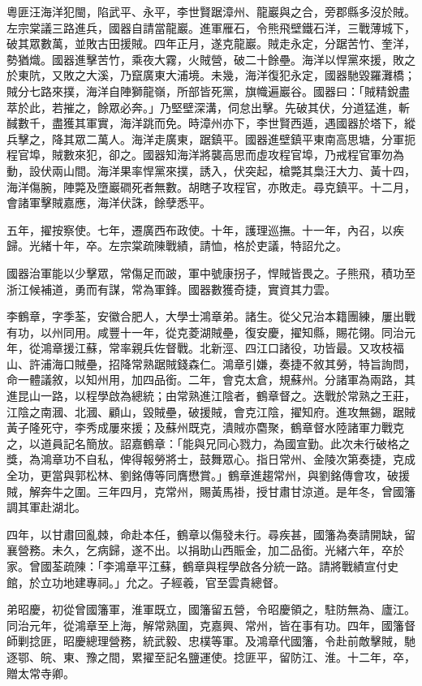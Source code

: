 \begin{pinyinscope}
粵匪汪海洋犯閩，陷武平、永平，李世賢踞漳州、龍巖與之合，旁郡縣多沒於賊。左宗棠議三路進兵，國器自請當龍巖。進軍雁石，令熊飛壁鐵石洋，三戰薄城下，破其眾數萬，並敗古田援賊。四年正月，遂克龍巖。賊走永定，分踞苦竹、奎洋，勢猶熾。國器進擊苦竹，乘夜大霧，火賊營，破二十餘壘。海洋以悍黨來援，敗之於東阬，又敗之大溪，乃竄廣東大浦境。未幾，海洋復犯永定，國器馳毀羅灘橋；賊分七路來撲，海洋自陣獅龍嶺，所部皆死黨，旗幟遍巖谷。國器曰：「賊精銳盡萃於此，若摧之，餘眾必奔。」乃堅壁深溝，伺怠出擊。先破其伏，分道猛進，斬馘數千，盡獲其軍實，海洋跳而免。時漳州亦下，李世賢西遁，遇國器於塔下，縱兵擊之，降其眾二萬人。海洋走廣東，踞鎮平。國器進壁鎮平東南高思塘，分軍扼程官埠，賊數來犯，卻之。國器知海洋將襲高思而虛攻程官埠，乃戒程官軍勿為動，設伏兩山間。海洋果率悍黨來撲，誘入，伏突起，槍斃其梟汪大力、黃十四，海洋傷腕，陣斃及墮巖磵死者無數。胡瞎子攻程官，亦敗走。尋克鎮平。十二月，會諸軍擊賊嘉應，海洋伏誅，餘孽悉平。

五年，擢按察使。七年，遷廣西布政使。十年，護理巡撫。十一年，內召，以疾歸。光緒十年，卒。左宗棠疏陳戰績，請恤，格於吏議，特詔允之。

國器治軍能以少擊眾，常傷足而跛，軍中號康拐子，悍賊皆畏之。子熊飛，積功至浙江候補道，勇而有謀，常為軍鋒。國器數獲奇捷，實資其力雲。

李鶴章，字季荃，安徽合肥人，大學士鴻章弟。諸生。從父兄治本籍團練，屢出戰有功，以州同用。咸豐十一年，從克菱湖賊壘，復安慶，擢知縣，賜花翎。同治元年，從鴻章援江蘇，常率親兵佐督戰。北新涇、四江口諸役，功皆最。又攻枝福山、許浦海口賊壘，招降常熟踞賊錢森仁。鴻章引嫌，奏捷不敘其勞，特旨詢問，命一體議敘，以知州用，加四品銜。二年，會克太倉，規蘇州。分諸軍為兩路，其進昆山一路，以程學啟為總統；由常熟進江陰者，鶴章督之。迭戰於常熟之王莊，江陰之南漍、北漍、顧山，毀賊壘，破援賊，會克江陰，擢知府。進攻無錫，踞賊黃子隆死守，李秀成屢來援；及蘇州既克，潰賊亦麕聚，鶴章督水陸諸軍力戰克之，以道員記名簡放。詔嘉鶴章：「能與兄同心戮力，為國宣勤。此次未行破格之獎，為鴻章功不自私，俾得報勞將士，鼓舞眾心。指日常州、金陵次第奏捷，克成全功，更當與郭松林、劉銘傳等同膺懋賞。」鶴章進趨常州，與劉銘傳會攻，破援賊，解奔牛之圍。三年四月，克常州，賜黃馬褂，授甘肅甘涼道。是年冬，曾國籓調其軍赴湖北。

四年，以甘肅回亂棘，命赴本任，鶴章以傷發未行。尋疾甚，國籓為奏請開缺，留襄營務。未久，乞病歸，遂不出。以捐助山西賑金，加二品銜。光緒六年，卒於家。曾國荃疏陳：「李鴻章平江蘇，鶴章與程學啟各分統一路。請將戰績宣付史館，於立功地建專祠。」允之。子經羲，官至雲貴總督。

弟昭慶，初從曾國籓軍，淮軍既立，國籓留五營，令昭慶領之，駐防無為、廬江。同治元年，從鴻章至上海，解常熟圍，克嘉興、常州，皆在事有功。四年，國籓督師剿捻匪，昭慶總理營務，統武毅、忠樸等軍。及鴻章代國籓，令赴前敵擊賊，馳逐鄂、皖、東、豫之間，累擢至記名鹽運使。捻匪平，留防江、淮。十二年，卒，贈太常寺卿。


\end{pinyinscope}
